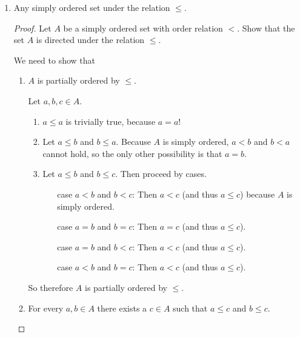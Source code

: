 \documentclass[12pt]{article}
\begin{document}
\begin{enumerate}
	\item Any simply ordered set under the relation $\leq$.
	      \begin{proof}
		      Let $A$ be a simply ordered set with order relation $<$. Show that the set $A$ is directed under the relation $\leq$.

		      We need to show that
		      \begin{enumerate}
			      \item\label{pf:part-order} $A$ is partially ordered by $\leq$.

			            Let $a, b, c \in A$.
			            \begin{enumerate}
				            \item $a \leq a$ is trivially true, because $a = a$!
				            \item Let $a \leq b$ and $b \leq a$. Because $A$ is simply ordered, $a < b$ and $b < a$ cannot hold, so the only other possibility is that $a = b$.
				            \item Let $a \leq b$ and $b \leq c$. Then proceed by cases.
				                  \begin{itemize}
					                  \item[case $a < b$ and $b < c$:] Then $a < c$ (and thus $a \leq c$) because $A$ is simply ordered.
					                  \item[case $a = b$ and $b = c$:] Then $a = c$ (and thus $a \leq c$).
					                  \item[case $a = b$ and $b < c$:] Then $a < c$ (and thus $a \leq c$).
					                  \item[case $a < b$ and $b = c$:] Then $a < c$ (and thus $a \leq c$).
				                  \end{itemize}
			            \end{enumerate}
			            So therefore $A$ is partially ordered by $\leq$.
			      \item\label{pf:part-directed} For every $a, b \in A$ there exists a $c \in A$ such that $a \leq c$ and $b \leq c$.


\end{enumerate}
\end{proof}
\end{enumerate}
\end{document}
